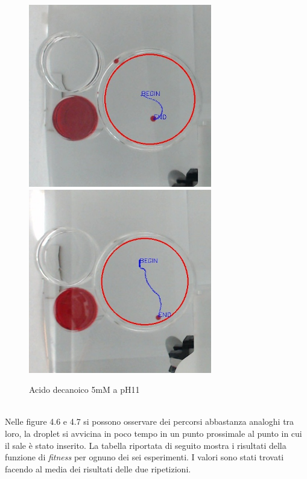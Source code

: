 \begin{figure}[h]
	\centering
   		{\includegraphics[width=8cm]{immagini/5mMpH11-2.jpg}}
 	\hspace{2mm}   	
		{\includegraphics[width=8cm]{immagini/5mMpH11-1.jpg}}
	\caption{Acido decanoico 5mM a pH11}
\end{figure}
\pagebreak
\\Nelle figure 4.6 e 4.7 si possono osservare dei percorsi abbastanza analoghi tra loro, la droplet si avvicina in poco tempo in un punto prossimale al punto in cui il sale è stato inserito.
La tabella riportata di seguito mostra i risultati della funzione di \emph{fitness} per ognuno dei sei esperimenti. I valori sono stati trovati facendo al media dei risultati delle due ripetizioni.

